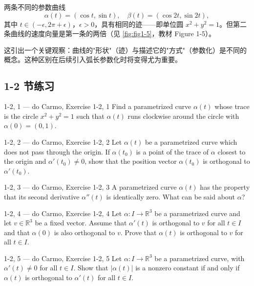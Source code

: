 \begin{Example}[相同迹的不同参数化]\label{ex:same-trace-different-param}
两条不同的参数曲线
\[
\alpha(t) = (\cos t, \sin t),\quad \beta(t) = (\cos 2t, \sin 2t),
\]
其中 $t \in (-\epsilon, 2\pi + \epsilon)$，$\epsilon > 0$，具有相同的迹——即单位圆 $x^2 + y^2 = 1$。但第二条曲线的速度向量是第一条的两倍（见 \cref{fig:fig1-5}，教材 Figure 1-5）。

这引出一个关键观察：曲线的"形状"（迹）与描述它的"方式"（参数化）是不同的概念。这种区别在后续引入弧长参数化时将变得尤为重要。
\end{Example}

\subsection*{1-2 节练习}

\begin{exercise}{1-2, 1 — do Carmo, Exercise 1-2, 1}
Find a parametrized curve $\alpha(t)$ whose trace is the circle $x^2 + y^2 = 1$ such that $\alpha(t)$ runs clockwise around the circle with $\alpha(0) = (0, 1)$.
\end{exercise}

\begin{exercise}{1-2, 2 — do Carmo, Exercise 1-2, 2}
Let $\alpha(t)$ be a parametrized curve which does not pass through the origin. If $\alpha(t_0)$ is a point of the trace of $\alpha$ closest to the origin and $\alpha'(t_0) \neq 0$, show that the position vector $\alpha(t_0)$ is orthogonal to $\alpha'(t_0)$.
\end{exercise}

\begin{exercise}{1-2, 3 — do Carmo, Exercise 1-2, 3}
A parametrized curve $\alpha(t)$ has the property that its second derivative $\alpha''(t)$ is identically zero. What can be said about $\alpha$?
\end{exercise}

\begin{exercise}{1-2, 4 — do Carmo, Exercise 1-2, 4}
Let $\alpha: I \to \mathbb{R}^3$ be a parametrized curve and let $v \in \mathbb{R}^3$ be a fixed vector. Assume that $\alpha'(t)$ is orthogonal to $v$ for all $t \in I$ and that $\alpha(0)$ is also orthogonal to $v$. Prove that $\alpha(t)$ is orthogonal to $v$ for all $t \in I$.
\end{exercise}

\begin{exercise}{1-2, 5 — do Carmo, Exercise 1-2, 5}
Let $\alpha: I \to \mathbb{R}^3$ be a parametrized curve, with $\alpha'(t) \neq 0$ for all $t \in I$. Show that $|\alpha(t)|$ is a nonzero constant if and only if $\alpha(t)$ is orthogonal to $\alpha'(t)$ for all $t \in I$.
\end{exercise}

